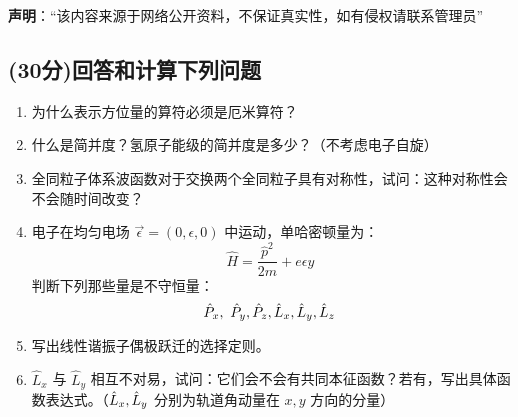 
\textbf{声明}：“该内容来源于网络公开资料，不保证真实性，如有侵权请联系管理员”

\subsection{(30分)回答和计算下列问题}
\begin{enumerate}
    \item 为什么表示方位量的算符必须是厄米算符？
    \item 什么是简并度？氢原子能级的简并度是多少？（不考虑电子自旋）
    \item 全同粒子体系波函数对于交换两个全同粒子具有对称性，试问：这种对称性会不会随时间改变？
    \item 电子在均匀电场 $\vec{\epsilon}=(0, \epsilon, 0)$ 中运动，单哈密顿量为：
      \[      \hat{H} = \frac{\hat{p}^2}{2m} + e\epsilon y ~\]
      判断下列那些量是不守恒量：
      \[      \hat{P}_x,\ \hat{P}_y,\\ \hat{P}_z,\\ \hat{L}_x,\\ \hat{L}_y,\\ \hat{L}_z ~\]
    \item 写出线性谐振子偶极跃迁的选择定则。
    \item $\hat{L}_x$ 与 $\hat{L}_y$ 相互不对易，试问：它们会不会有共同本征函数？若有，写出具体函数表达式。（$\hat{L}_x,\\ \hat{L}_y$ 分别为轨道角动量在 $x, y$ 方向的分量）
  \end{enumerate}